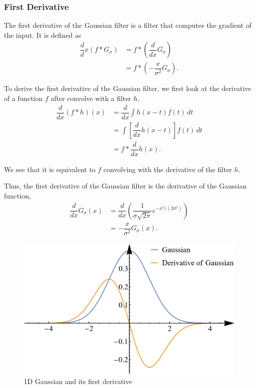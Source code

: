 \subsubsection{First Derivative}

The first derivative of the Gaussian filter is a filter that computes the gradient of the input. It is defined as \begin{align*}
    \dfrac{d}{d}x \left( f \ast G_\sigma \right) & = f \ast \left( \dfrac{d}{dx} G_\sigma \right)         \\
                                                 & = f \ast \left( -\dfrac{x}{\sigma^2} G_\sigma \right).
\end{align*}

\begin{remark}
    To derive the first derivative of the Gaussian filter, we first look at the derivative of a function $f$ after convolve with a filter $h$, \begin{align*}
        \dfrac{d}{dx} (f \ast h)(x) & = \dfrac{d}{dx} \int h(x - t) f(t) \, dt                \\
                                    & = \int \left[ \dfrac{d}{dx} h(x - t) \right] f(t) \, dt \\
                                    & = f \ast \dfrac{d}{dx} h(x).
    \end{align*}

    We see that it is equivalent to $f$ convolving with the derivative of the filter $h$.

    Thus, the first derivative of the Gaussian filter is the derivative of the Gaussian function, \begin{align*}
        \dfrac{d}{dx} G_{\sigma}(x) & = \dfrac{d}{dx} \left( \dfrac{1}{\sigma\sqrt{2\pi}} e^{-x^2 / (2\sigma^2)} \right) \\
                                    & = -\dfrac{x}{\sigma^2} G_{\sigma}(x).
    \end{align*}
\end{remark}

\begin{figure}[ht!]
    \centering
    \includegraphics[width=0.5\linewidth]{figures/1d-gaussian-derivative.png}
    \caption{1D Gaussian and its first derivative}
\end{figure}

